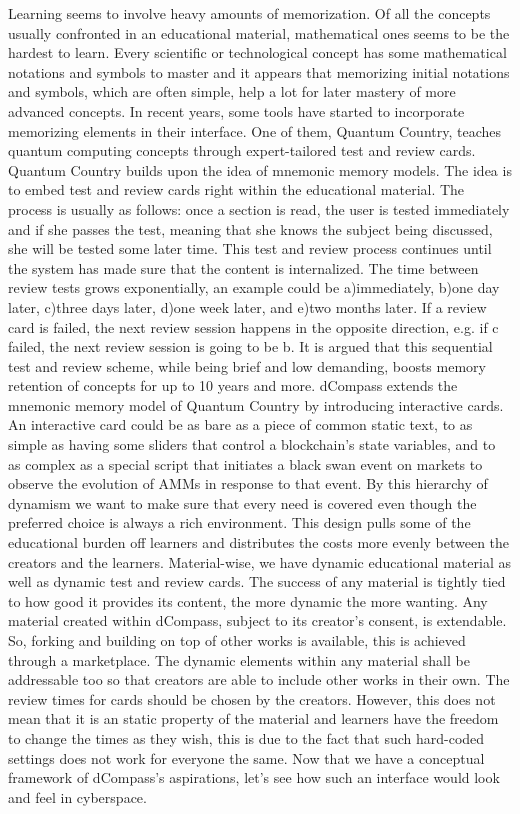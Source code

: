 \documentclass[12pt, a4paper]{article}
\begin{document}
Learning seems to involve heavy amounts of memorization. Of all the concepts usually confronted in  an educational material, mathematical ones seems to be the hardest to learn. Every scientific or technological concept has some mathematical notations and symbols to master and it appears that memorizing initial notations and symbols, which are often simple, help a lot for later mastery of more advanced concepts\cite{nielsen}. In recent years, some tools have started to incorporate memorizing elements in their interface. One of them, Quantum Country, teaches quantum computing concepts through expert-tailored test and review cards. Quantum Country builds upon the idea of mnemonic memory models\cite{matuschak}. The idea is to embed test and review cards right within the educational material. The process is usually as follows: once a section is read, the user is tested immediately and if she passes the test, meaning that she knows the subject being discussed, she will be tested some later time. This test and review process continues until the system has made sure that the content is internalized. The time between review tests grows exponentially, an example could be a)immediately, b)one day later, c)three days later, d)one week later, and e)two months later. If a review card is failed, the next review session happens in the opposite direction, e.g. if c failed, the next review session is going to be b. It is argued that this sequential test and review scheme, while being brief and low demanding, boosts memory retention of concepts for up to 10 years and more\cite{nielsen}\cite{matuschak}.
dCompass extends the mnemonic memory model of Quantum Country by introducing interactive cards.  An interactive card could be as bare as a piece of common static text, to as simple as having some sliders that control a blockchain's state variables, and to as complex as a special script that initiates a black swan event on markets to observe the evolution of AMMs in response to that event. By this hierarchy of dynamism we want to make sure that every need is covered even though the preferred choice is always a rich environment. This design pulls some of the educational burden off learners and distributes the costs more evenly between the creators and the learners. Material-wise, we have dynamic educational material as well as dynamic test and review cards. The success of any material is tightly tied to how good it provides its content, the more dynamic the more wanting. Any material created within dCompass, subject to its creator’s consent, is extendable. So, forking and building on top of other works is available, this is achieved through a marketplace. The dynamic elements within any material shall be addressable too so that creators are able to include other works in their own. The review times for cards should be chosen by the creators. However, this does not mean that it is an static property of the material and learners have the freedom to change the times as they wish, this is due to the fact that such hard-coded settings does not work for everyone the same. Now that we have a conceptual framework of dCompass's aspirations, let’s see how such an interface would look and feel in cyberspace.
\end{document}
